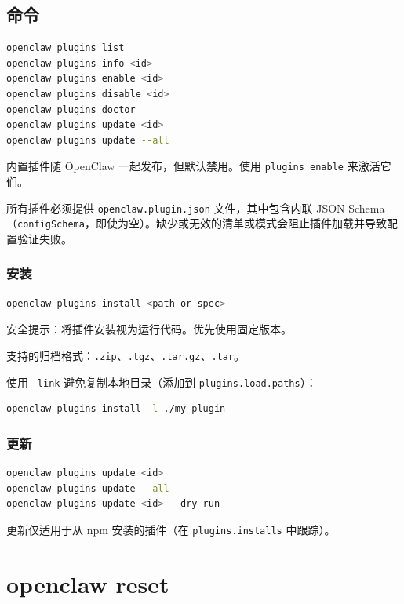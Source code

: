 \subsection{命令}


\begin{lstlisting}[language=bash]
openclaw plugins list
openclaw plugins info <id>
openclaw plugins enable <id>
openclaw plugins disable <id>
openclaw plugins doctor
openclaw plugins update <id>
openclaw plugins update --all
\end{lstlisting}


内置插件随 OpenClaw 一起发布，但默认禁用。使用 \texttt{plugins enable} 来激活它们。

所有插件必须提供 \texttt{openclaw.plugin.json} 文件，其中包含内联 JSON Schema（\texttt{configSchema}，即使为空）。缺少或无效的清单或模式会阻止插件加载并导致配置验证失败。

\subsubsection{安装}


\begin{lstlisting}[language=bash]
openclaw plugins install <path-or-spec>
\end{lstlisting}


安全提示：将插件安装视为运行代码。优先使用固定版本。

支持的归档格式：\texttt{.zip}、\texttt{.tgz}、\texttt{.tar.gz}、\texttt{.tar}。

使用 \texttt{--link} 避免复制本地目录（添加到 \texttt{plugins.load.paths}）：

\begin{lstlisting}[language=bash]
openclaw plugins install -l ./my-plugin
\end{lstlisting}


\subsubsection{更新}


\begin{lstlisting}[language=bash]
openclaw plugins update <id>
openclaw plugins update --all
openclaw plugins update <id> --dry-run
\end{lstlisting}


更新仅适用于从 npm 安装的插件（在 \texttt{plugins.installs} 中跟踪）。


\clearpage

\section{openclaw reset}


